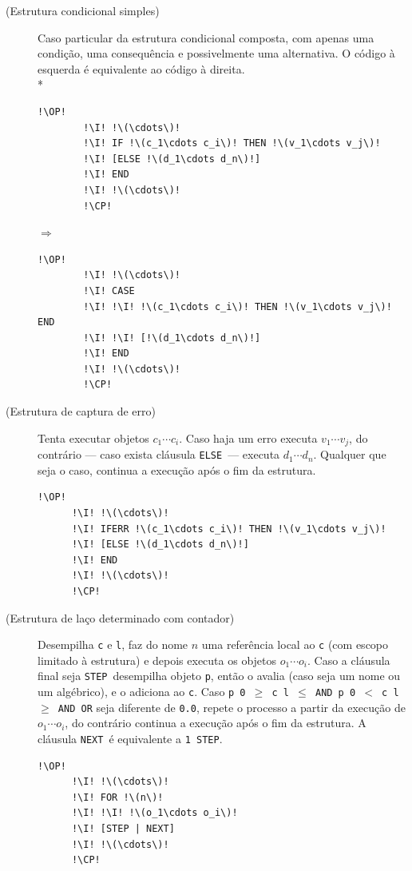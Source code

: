 \documentclass[12pt,a4paper]{report}
\newcommand{\kwd}[1]{\texttt{\textcolor{keyword}{#1}}}
\newcommand{\I}{\enspace\textcolor{indent}\vrule\hspace{2pt}}
\newcommand{\ELSE}{\kwd{ELSE}}   %
\newcommand{\NEXT}{\kwd{NEXT}}   %
\newcommand{\STEP}{\kwd{STEP}}   %
\newcommand{\AND}{\kwd{AND}}   %
\newcommand{\OR}{\kwd{OR}}   %
\newcommand{\LESS}{\kwd{$<$}}   %
\newcommand{\LEQ}{\kwd{$\leq$}}   %
\newcommand{\GEQ}{\kwd{$\geq$}}   %
\newcommand{\OP}{\kwd{$\ll$}}   %
\newcommand{\CP}{\kwd{$\gg$}}   %
\newcommand{\crlf}{\mbox{}\\*}
\numberwithin{theorem}{chapter}
\begin{document}
\begin{description}
  \item[(Estrutura condicional simples)] Caso particular da estrutura
    condicional composta, com apenas uma condição, uma consequência e
    possivelmente uma alternativa.  O código à esquerda é equivalente
    ao código à direita.\crlf
    \begin{minipage}{.45\textwidth}
      \begin{lstlisting}[language=userrpl,numbers=none]
        !\OP!
        !\I! !\(\cdots\)!
        !\I! IF !\(c_1\cdots c_i\)! THEN !\(v_1\cdots v_j\)!
        !\I! [ELSE !\(d_1\cdots d_n\)!]
        !\I! END
        !\I! !\(\cdots\)!
        !\CP!
      \end{lstlisting}
    \end{minipage}
    \(\Longrightarrow\)
    \begin{minipage}{.45\textwidth}
      \begin{lstlisting}[language=userrpl,numbers=none]
        !\OP!
        !\I! !\(\cdots\)!
        !\I! CASE
        !\I! !\I! !\(c_1\cdots c_i\)! THEN !\(v_1\cdots v_j\)! END
        !\I! !\I! [!\(d_1\cdots d_n\)!]
        !\I! END
        !\I! !\(\cdots\)!
        !\CP!
      \end{lstlisting}
    \end{minipage}

  \item[(Estrutura de captura de erro)] Tenta executar objetos
    \(c_1\cdots c_i\).  Caso haja um erro executa \(v_1\cdots v_j\),
    do contrário --- caso exista cláusula \ELSE\ --- executa
    \(d_1\cdots d_n\).  Qualquer que seja o caso, continua a execução
    após o fim da estrutura.
    \begin{lstlisting}[language=userrpl,numbers=none]
      !\OP!
      !\I! !\(\cdots\)!
      !\I! IFERR !\(c_1\cdots c_i\)! THEN !\(v_1\cdots v_j\)!
      !\I! [ELSE !\(d_1\cdots d_n\)!]
      !\I! END
      !\I! !\(\cdots\)!
      !\CP!
    \end{lstlisting}

  \item[(Estrutura de laço determinado com contador)] Desempilha
    \texttt{c} e \texttt{l}, faz do nome \(n\) uma referência local ao
    \texttt{c} (com escopo limitado à estrutura) e depois executa os
    objetos \(o_1\cdots o_i\).  Caso a cláusula final seja
    \STEP\ desempilha objeto \texttt{p}, então o avalia (caso seja um
    nome ou um algébrico), e o adiciona ao \texttt{c}.  Caso \texttt{p
      0 \GEQ\ c l \LEQ\ \AND\ p 0 \LESS\ c l \GEQ\ \AND\ \OR} seja
    diferente de \texttt{0.0}, repete o processo a partir da execução de
    \(o_1\cdots o_i\), do contrário continua a execução após o fim da
    estrutura.  A cláusula \NEXT\ é equivalente a \texttt{1 \STEP}.
    \begin{lstlisting}[language=userrpl,numbers=none]
      !\OP!
      !\I! !\(\cdots\)!
      !\I! FOR !\(n\)!
      !\I! !\I! !\(o_1\cdots o_i\)!
      !\I! [STEP | NEXT]
      !\I! !\(\cdots\)!
      !\CP!
    \end{lstlisting}


\end{description}
\end{document}
